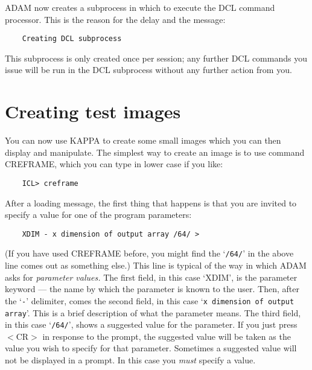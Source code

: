 ADAM now creates a subprocess in which to execute the DCL command processor.
This is the reason for the delay and the message:

\begin{small}
\begin{verbatim}
    Creating DCL subprocess
\end{verbatim}
\end{small}

This subprocess is only created once per session; any further DCL commands you
issue will be run in the DCL subprocess without any further action from you.

\section{Creating test images}
\label{S_creimag}

You can now use KAPPA to create some small images which you can then display
and manipulate.
The simplest way to create an image is to use command CREFRAME, which
you can type in lower case if you like:

\begin{small}
\begin{verbatim}
    ICL> creframe
\end{verbatim}
\end{small}

After a loading message, the first thing that happens is that you are invited
to specify a value for one of the program parameters:

\begin{small}
\begin{verbatim}
    XDIM - x dimension of output array /64/ >
\end{verbatim}
\end{small}

(If you have used CREFRAME before, you might find the `\verb+/64/+' in the
above
line comes out as something else.)
This line is typical of the way in which ADAM asks for {\em parameter values.}
The first field, in this case `XDIM', is the parameter keyword --- the name by
which the parameter is known to the user.
Then, after the `\verb+-+' delimiter, comes the second field, in this case
`\verb+x dimension of output array+'.
This is a brief description of what the parameter means.
The third field, in this case `\verb+/64/+', shows a suggested value for the
parameter.
If you just press $<$CR$>$ in response to the prompt, the suggested value will
be taken as the value you wish to specify for that parameter.
Sometimes a suggested value will not be displayed in a prompt.
In this case you {\em must} specify a value.

